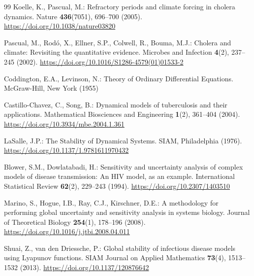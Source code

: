 \documentclass[11pt]{article}
\theoremstyle{plain}
\theoremstyle{definition}
\theoremstyle{remark}
\begin{document}
\begin{thebibliography}{99}
Koelle, K., Pascual, M.: Refractory periods and climate forcing in cholera dynamics. Nature \textbf{436}(7051), 696--700 (2005). \url{https://doi.org/10.1038/nature03820}

Pascual, M., Rod\'{o}, X., Ellner, S.P., Colwell, R., Bouma, M.J.: Cholera and climate: Revisiting the quantitative evidence. Microbes and Infection \textbf{4}(2), 237--245 (2002). \url{https://doi.org/10.1016/S1286-4579(01)01533-2}

Coddington, E.A., Levinson, N.: Theory of Ordinary Differential Equations. McGraw-Hill, New York (1955)

Castillo-Chavez, C., Song, B.: Dynamical models of tuberculosis and their applications. Mathematical Biosciences and Engineering \textbf{1}(2), 361--404 (2004). \url{https://doi.org/10.3934/mbe.2004.1.361}

LaSalle, J.P.: The Stability of Dynamical Systems. SIAM, Philadelphia (1976). \url{https://doi.org/10.1137/1.9781611970432}

Blower, S.M., Dowlatabadi, H.: Sensitivity and uncertainty analysis of complex models of disease transmission: An HIV model, as an example. International Statistical Review \textbf{62}(2), 229--243 (1994). \url{https://doi.org/10.2307/1403510}

Marino, S., Hogue, I.B., Ray, C.J., Kirschner, D.E.: A methodology for performing global uncertainty and sensitivity analysis in systems biology. Journal of Theoretical Biology \textbf{254}(1), 178--196 (2008). \url{https://doi.org/10.1016/j.jtbi.2008.04.011}

Shuai, Z., van den Driessche, P.: Global stability of infectious disease models using Lyapunov functions. SIAM Journal on Applied Mathematics \textbf{73}(4), 1513--1532 (2013). \url{https://doi.org/10.1137/120876642}

\end{thebibliography}
\end{document}
